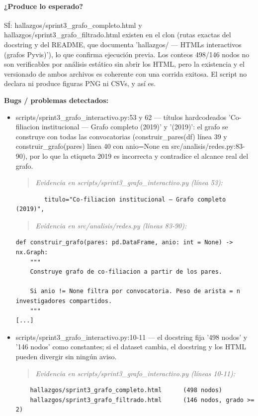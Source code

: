 \paragraph{¿Produce lo esperado?}
SÍ: hallazgos/sprint3\_grafo\_completo.html y hallazgos/sprint3\_grafo\_filtrado.html existen en el clon (rutas exactas del docstring y del README, que documenta 'hallazgos/ --- HTMLs interactivos (grafos Pyvis)'), lo que confirma ejecución previa. Los conteos 498/146 nodos no son verificables por análisis estático sin abrir los HTML, pero la existencia y el versionado de ambos archivos es coherente con una corrida exitosa. El script no declara ni produce figuras PNG ni CSVs, y así es.

\begin{tcolorbox}[riesgo]
\textbf{Bugs / problemas detectados:}
\begin{itemize}
  \item scripts/sprint3\_grafo\_interactivo.py:53 y 62 --- títulos hardcodeados 'Co-filiacion institucional --- Grafo completo (2019)' y '(2019)': el grafo se construye con todas las convocatorias (construir\_pares(df) línea 39 y construir\_grafo(pares) línea 40 con anio=None en src/analisis/redes.py:83-90), por lo que la etiqueta 2019 es incorrecta y contradice el alcance real del grafo.
\begin{quote}\footnotesize\ttfamily
\noindent\emph{Evidencia en scripts/sprint3\_grafo\_interactivo.py (línea 53):}
\end{quote}
\begin{lstlisting}
        titulo="Co-filiacion institucional — Grafo completo (2019)",
\end{lstlisting}

\begin{quote}\footnotesize\ttfamily
\noindent\emph{Evidencia en src/analisis/redes.py (líneas 83-90):}
\end{quote}
\begin{lstlisting}
def construir_grafo(pares: pd.DataFrame, anio: int = None) -> nx.Graph:
    """
    Construye grafo de co-filiacion a partir de los pares.

    Si anio != None filtra por convocatoria. Peso de arista = n investigadores compartidos.
    """
[...]
\end{lstlisting}

  \item scripts/sprint3\_grafo\_interactivo.py:10-11 --- el docstring fija '498 nodos' y '146 nodos' como constantes; si el dataset cambia, el docstring y los HTML pueden divergir sin ningún aviso.
\begin{quote}\footnotesize\ttfamily
\noindent\emph{Evidencia en scripts/sprint3\_grafo\_interactivo.py (líneas 10-11):}
\end{quote}
\begin{lstlisting}
    hallazgos/sprint3_grafo_completo.html      (498 nodos)
    hallazgos/sprint3_grafo_filtrado.html      (146 nodos, grado >= 2)
\end{lstlisting}

\end{itemize}
\end{tcolorbox}

